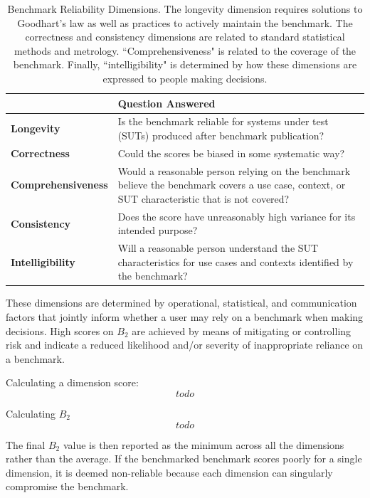 \documentclass{article}
\newcommand\bb{$B_2$ }
\begin{document}
\begin{table}[h!]
  \caption{Benchmark Reliability Dimensions. The longevity dimension requires solutions to Goodhart's law as well as practices to actively maintain the benchmark. The correctness and consistency dimensions are related to standard statistical methods and metrology. ``Comprehensiveness" is related to the coverage of the benchmark. Finally, ``intelligibility" is determined by how these dimensions are expressed to people making decisions.}
  \label{tab:benchmark-reliability-dimensions}
\label{tab:dimensions}
  \centering
  \begin{tabular}{lp{10cm}}
    \toprule
    & \textbf{Question Answered} \\
    \midrule
    \textbf{Longevity} & Is the benchmark reliable for systems under test (SUTs) produced after benchmark publication? \\
    \textbf{Correctness} & Could the scores be biased in some systematic way? \\
    \textbf{Comprehensiveness} & Would a reasonable person relying on the benchmark believe the benchmark covers a use case, context, or SUT characteristic that is not covered? \\
    \textbf{Consistency} & Does the score have unreasonably high variance for its intended purpose? \\
    \textbf{Intelligibility} & Will a reasonable person understand the SUT characteristics for use cases and contexts identified by the benchmark? \\
    \bottomrule
  \end{tabular}
\end{table}

These dimensions are determined by operational, statistical, and communication factors that jointly inform whether a user may rely on a benchmark when making decisions. High scores on \bb are achieved by means of mitigating or controlling risk and indicate a reduced likelihood and/or severity of inappropriate reliance on a benchmark.

Calculating a dimension score:
\begin{equation}
todo
\end{equation}

Calculating \bb
\begin{equation}
todo
\end{equation}

The final \bb value is then reported as the minimum across all the dimensions rather than the average. If the benchmarked benchmark scores poorly for a single dimension, it is deemed non-reliable because each dimension can singularly compromise the benchmark.
\end{document}
